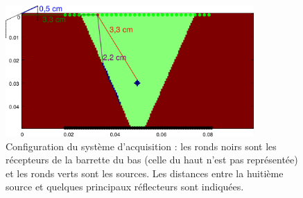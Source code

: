 \documentclass[a4paper,11pt]{report} %
\begin{document}
\begin{figure}[!h]
	\centering
	\includegraphics[height=5cm]{img/multi_ref_trans/config.png}
	\caption{Configuration du système d'acquisition  : les ronds noirs sont les récepteurs de la barrette du bas (celle du haut n'est pas représentée) et les ronds verts sont les sources. Les distances entre la huitième source et quelques principaux réflecteurs sont indiquées.\label{config}}
\end{figure}
\end{document}

